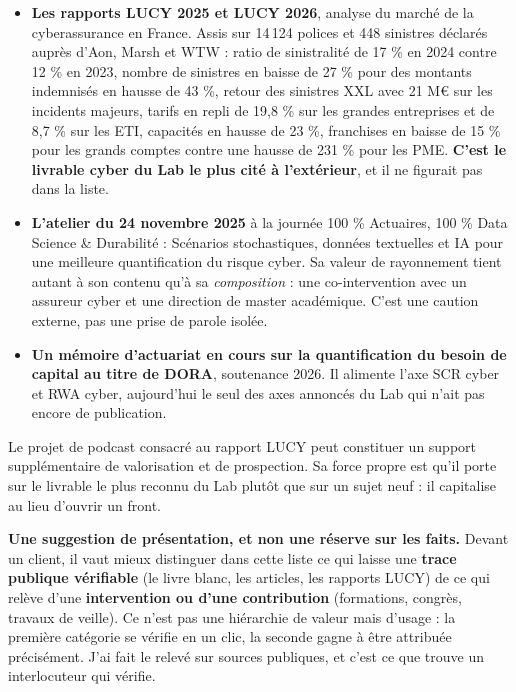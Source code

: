 \documentclass[11pt,a4paper]{article}
\newcommand{\encadre}[2]{%
  \vspace{2pt}\noindent\colorbox{grisclair}{%
  \begin{minipage}{\dimexpr\textwidth-2\fboxsep}
  \footnotesize\textbf{#1} #2
  \end{minipage}}\vspace{3pt}}
\begin{document}
\begin{itemize}
\item \textbf{Les rapports LUCY 2025 et LUCY 2026}, analyse du marché de la cyberassurance en
      France. Assis sur 14\,124 polices et 448 sinistres déclarés auprès d'Aon, Marsh et WTW :
      ratio de sinistralité de 17 \% en 2024 contre 12 \% en 2023, nombre de sinistres en baisse
      de 27 \% pour des montants indemnisés en hausse de 43 \%, retour des sinistres XXL avec
      21 M\euro{} sur les incidents majeurs, tarifs en repli de 19,8 \% sur les grandes
      entreprises et de 8,7 \% sur les ETI, capacités en hausse de 23 \%, franchises en baisse
      de 15 \% pour les grands comptes contre une hausse de 231 \% pour les PME.
      \textbf{C'est le livrable cyber du Lab le plus cité à l'extérieur}, et il ne figurait pas
      dans la liste.
\item \textbf{L'atelier du 24 novembre 2025} à la journée 100 \% Actuaires, 100 \% Data Science
      \& Durabilité : \og{}Scénarios stochastiques, données textuelles et IA pour une meilleure
      quantification du risque cyber\fg{}. Sa valeur de rayonnement tient autant à son contenu
      qu'à sa \emph{composition} : une co-intervention avec un assureur cyber et une direction de
      master académique. C'est une caution externe, pas une prise de parole isolée.
\item \textbf{Un mémoire d'actuariat en cours sur la quantification du besoin de capital au
      titre de DORA}, soutenance 2026. Il alimente l'axe SCR cyber et RWA cyber, aujourd'hui le
      seul des axes annoncés du Lab qui n'ait pas encore de publication.
\end{itemize}

\noindent Le projet de podcast consacré au rapport LUCY peut constituer un support
supplémentaire de valorisation et de prospection. Sa force propre est qu'il porte sur le
livrable le plus reconnu du Lab plutôt que sur un sujet neuf : il capitalise au lieu d'ouvrir un
front.

\encadre{Une suggestion de présentation, et non une réserve sur les faits.}{Devant un client, il
vaut mieux distinguer dans cette liste ce qui laisse une \textbf{trace publique vérifiable} (le
livre blanc, les articles, les rapports LUCY) de ce qui relève d'une \textbf{intervention ou
d'une contribution} (formations, congrès, travaux de veille). Ce n'est pas une hiérarchie de
valeur mais d'usage : la première catégorie se vérifie en un clic, la seconde gagne à être
attribuée précisément. J'ai fait le relevé sur sources publiques, et c'est ce que trouve un
interlocuteur qui vérifie.}
\end{document}
